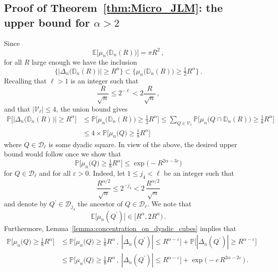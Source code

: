 \documentclass[11pt]{amsart}
\theoremstyle{definition}
\theoremstyle{remark}
\numberwithin{equation}{section}
\def\eps{{\varepsilon}}
\newcommand{\bD}{\mathbb D}
\newcommand{\bP}{\mathbb P}
\newcommand{\bE}{\mathbb E}
\begin{document}
	\subsection{Proof of Theorem~\ref{thm:Micro_JLM}: the upper bound for \texorpdfstring{$\alpha>2$}{alpha > 2}}
	Since
	$$
	\bE\big[\mu_n\big(\bD_n(R)\big)\big] = \pi R^2 \, ,
	$$
	for all $R$ large enough we have the inclusion
	\begin{equation*}
		\Big\{ |\Delta_n\big(\bD_n(R)\big)| \ge R^\alpha \Big\}\subset \Big\{ \mu_n\big(\bD_n(R)\big) \ge \tfrac{1}{2} R^{\alpha} \Big\}\, .
	\end{equation*}
	Recalling that $\ell> 1$ is an integer such that
	\[
	\frac{R}{\sqrt{n}} \le 2^{-\ell} < 2\frac{R}{\sqrt{n}} \, ,
	\]
	and that $|\mathcal{V}_\ell |\le 4$, the union bound gives
	\begin{align*}	
		\bP\Big[|\Delta_n\big(\bD_n(R)\big)| \ge R^\alpha\Big] & \le \bP\Big[\mu_n\big(\bD_n(R)\big) \ge \frac{1}{2} R^{\alpha}\Big] \le \sum_{Q\in \mathcal{V}_\ell } \bP\Big[ \mu_n\big(Q\cap \bD_n(R)\big) \ge \frac{1}{8} R^\alpha \Big] \\
		& \le 4 \times \bP\Big[ \mu_n\big(Q\big) \ge \tfrac{1}{8} R^\alpha \Big]
	\end{align*}
	where $Q\in \mathcal{D}_\ell$ is some dyadic square. In view of the above, the desired upper bound would follow once we show that
	\begin{equation}
		\label{eq:overcrowding_upper_bound_desired_bound}
		\bP\Big[ \mu_n\big(Q\big) \ge \tfrac{1}{8} R^\alpha \Big] \le \exp\Big(-R^{2\alpha-3\eps}\Big)
	\end{equation}
	for $Q\in \mathcal{D}_\ell$ and for all $\eps>0$. Indeed, let $1\le j_4<\ell$ be an integer such that
	\begin{equation}
		\label{eq:def_of_j_4}
		\frac{R^{\alpha/2}}{\sqrt{n}} \le 2^{-j_4} < 2\, \frac{R^{\alpha/2}}{\sqrt{n}}
	\end{equation}
	and denote by $Q^\prime\in \mathcal{D}_{j_4}$ the ancestor of $Q\in \mathcal{D}_\ell$. We note that 
	\begin{equation}
		\label{eq:overcrowding_upper_bound_expectation_of_top_cube}
		\bE\big[\mu_n(Q^\prime)\big] \in \big[R^\alpha,2R^\alpha\big) \, .
	\end{equation}
	Furthermore, Lemma~\ref{lemma:concentration_on_dyadic_cubes} implies that 
	\begin{align}\label{eq:overcrowding_upper_bound_split_of_probabilities}
		\bP\big[ \mu_n\big(Q\big) \ge \tfrac{1}{8} R^\alpha \big] & \le \bP\Big[ \mu_n\big(Q\big) \ge \tfrac{1}{8} R^\alpha \, , \ |\Delta_{n}(Q^\prime)| \le R^{\alpha-\eps} \Big] + \bP\Big[|\Delta_n(Q^\prime)| \ge R^{\alpha-\eps} \Big]\nonumber\\
		& \le \bP\Big[ \mu_n\big(Q\big) \ge \tfrac{1}{8} R^\alpha \, , \ |\Delta_{n}(Q^\prime)| \le R^{\alpha-\eps} \Big] + \exp\Big(-c \, R^{2\alpha-2\eps}\, \Big) \, .
	\end{align}
\end{document}
